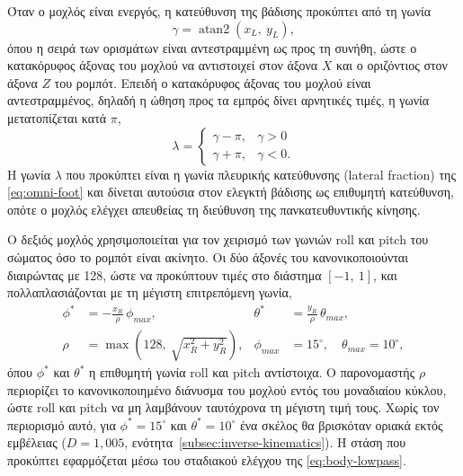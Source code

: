 \documentclass[11pt]{report}
\begin{document}
Όταν ο μοχλός είναι ενεργός, η κατεύθυνση της βάδισης προκύπτει από τη γωνία
\begin{equation}
\gamma = \operatorname{atan2}(x_L,\ y_L),
\label{eq:joystick-angle}
\end{equation}
όπου η σειρά των ορισμάτων είναι αντεστραμμένη ως προς τη συνήθη, ώστε ο
κατακόρυφος άξονας του μοχλού να αντιστοιχεί στον άξονα $X$ και ο οριζόντιος
στον άξονα $Z$ του ρομπότ. Επειδή ο κατακόρυφος άξονας του μοχλού είναι
αντεστραμμένος, δηλαδή η ώθηση προς τα εμπρός δίνει αρνητικές τιμές, η γωνία
μετατοπίζεται κατά $\pi$,
\begin{equation}
\lambda =
\begin{cases}
\gamma - \pi, & \gamma > 0 \\[4pt]
\gamma + \pi, & \gamma < 0.
\end{cases}
\label{eq:joystick-lateral}
\end{equation}
Η γωνία $\lambda$ που προκύπτει είναι η γωνία πλευρικής κατεύθυνσης (lateral
fraction) της \eqref{eq:omni-foot} και δίνεται αυτούσια στον ελεγκτή βάδισης ως
επιθυμητή κατεύθυνση, οπότε ο μοχλός ελέγχει απευθείας τη διεύθυνση της
πανκατευθυντικής κίνησης.

Ο δεξιός μοχλός χρησιμοποιείται για τον χειρισμό των γωνιών roll και pitch του
σώματος όσο το ρομπότ είναι ακίνητο. Οι δύο άξονές του κανονικοποιούνται διαιρώντας με 128, ώστε να
προκύπτουν τιμές στο διάστημα $[-1,\ 1]$, και πολλαπλασιάζονται με τη μέγιστη
επιτρεπόμενη γωνία,
\begin{equation}
\begin{aligned}
\phi^{*} &= -\frac{x_R}{\rho}\,\phi_{max}, &
\theta^{*} &= \frac{y_R}{\rho}\,\theta_{max}, \\
\rho &= \max\!\left(128,\ \sqrt{x_R^2 + y_R^2}\right), &
\phi_{max} &= 15^\circ, \quad \theta_{max} = 10^\circ,
\end{aligned}
\label{eq:joystick-tilt}
\end{equation}
όπου $\phi^{*}$ και $\theta^{*}$ η επιθυμητή γωνία roll και pitch αντίστοιχα. Ο
παρονομαστής $\rho$ περιορίζει το κανονικοποιημένο διάνυσμα του μοχλού εντός
του μοναδιαίου κύκλου, ώστε roll και pitch να μη λαμβάνουν ταυτόχρονα τη
μέγιστη τιμή τους. Χωρίς τον περιορισμό αυτό, για $\phi^{*} = 15^\circ$ και
$\theta^{*} = 10^\circ$ ένα σκέλος θα βρισκόταν οριακά εκτός εμβέλειας
($D = 1{,}005$, ενότητα~\ref{subsec:inverse-kinematics}). Η στάση που
προκύπτει εφαρμόζεται μέσω του σταδιακού ελέγχου της
\eqref{eq:body-lowpass}.
\end{document}
